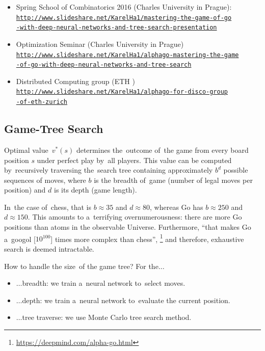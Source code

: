 \begin{itemize}
  \item Spring School of Combinatorics 2016 (Charles University in Prague): \\
    \href{http://www.slideshare.net/KarelHa1/mastering-the-game-of-go-with-deep-neural-networks-and-tree-search-presentation}
    {\tt http://www.slideshare.net/KarelHa1/mastering-the-game-of-go\\-with-deep-neural-networks-and-tree-search-presentation}

  \item Optimization Seminar (Charles University in Prague) \\
    \href{http://www.slideshare.net/KarelHa1/alphago-mastering-the-game-of-go-with-deep-neural-networks-and-tree-search}
    {\tt http://www.slideshare.net/KarelHa1/alphago-mastering-the-game\\-of-go-with-deep-neural-networks-and-tree-search}

  \item Distributed Computing group (ETH \Zurich) \\
    \href{http://www.slideshare.net/KarelHa1/alphago-for-disco-group-of-eth-zurich}
    {\tt http://www.slideshare.net/KarelHa1/alphago-for-disco-group\\-of-eth-zurich}
\end{itemize}

\subsection{Game-Tree Search}

Optimal value~$v^*(s)$ determines the~outcome of~the game from every board position $s$ under perfect play by~all players.
This value can be computed by~recursively traversing the~search tree containing approximately $b^d$ possible sequences of moves, where $b$ is the breadth of~game (number of legal moves per position) and $d$ is its depth (game length).

In~the case of~chess, that is $b \approx 35$ and $d \approx 80$, whereas Go has $b \approx 250$ and $d \approx 150$.
This amounts to a~terrifying overnumerousness: there are more Go positions than atoms in the observable Universe.
Furthermore, ``that makes Go a~googol [$10^{100}$] times more complex than chess'',%
\footnote{\href{https://deepmind.com/alpha-go.html}{https://deepmind.com/alpha-go.html}}
and therefore, exhaustive search is deemed intractable.

How to handle the size~of the game tree? For the$\dots$
\begin{itemize}
  \item $\dots$breadth: we train a~neural network to~select moves.
  \item $\dots$depth: we train a~neural network to~evaluate the current position.
  \item $\dots$tree traverse: we use Monte Carlo tree search method.
\end{itemize}

